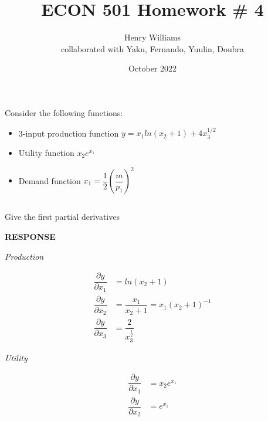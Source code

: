 \documentclass{article}
\title{ECON 501 Homework \# 4}
\author{Henry Williams\\ collaborated with Yaku, Fernando, Yuulin, Doubra}
\date{October 2022}
\begin{document}
\maketitle




\section{}

\colorbox{gray!30}{
\begin{minipage}{\textwidth}
Consider the following functions:\\

\begin{itemize}
    \item 3-input production function $y=x_1ln(x_2+1)+4x_3^{1/2}$
    \item Utility function $x_2e^{x_1}$ 
    \item Demand function $x_1=\dfrac{1}{2}\left( \dfrac{m}{p_1} \right)^2$
\end{itemize}
\end{minipage}
}

\subsection{}
\colorbox{gray!30}{
\begin{minipage}{\textwidth}
Give the first partial derivatives
\end{minipage}
}

\textbf{RESPONSE}

\emph{Production}

\begingroup
\addtolength{\jot}{1em} %
\begin{align*}
    \dfrac{\partial y}{\partial x_1} &=ln(x_2+1)\\
    \dfrac{\partial y}{\partial x_2} &=\dfrac{x_1}{x_2+1}=x_1(x_2+1)^{-1}\\
    \dfrac{\partial y}{\partial x_3} &=\dfrac{2}{x_3^{\frac{1}{2}}}
\end{align*}
\endgroup


\emph{Utility}

\begingroup
\addtolength{\jot}{1em} %
\begin{align*}
    \dfrac{\partial y}{\partial x_1} &=x_2e^{x_1}\\
    \dfrac{\partial y}{\partial x_2} &=e^{x_1}\\
\end{align*}
\endgroup
\end{document}
